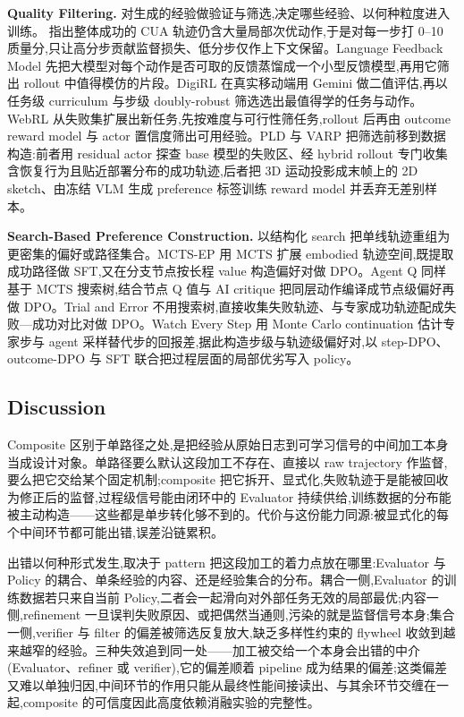 \textbf{Quality Filtering.} 对生成的经验做验证与筛选,决定哪些经验、以何种粒度进入训练。\cite{He25g} 指出整体成功的 CUA 轨迹仍含大量局部次优动作,于是对每一步打 0–10 质量分,只让高分步贡献监督损失、低分步仅作上下文保留。Language Feedback Model \cite{Zho24e} 先把大模型对每个动作是否可取的反馈蒸馏成一个小型反馈模型,再用它筛出 rollout 中值得模仿的片段。DigiRL \cite{Bai24} 在真实移动端用 Gemini 做二值评估,再以任务级 curriculum 与步级 doubly-robust 筛选选出最值得学的任务与动作。WebRL \cite{Qi24} 从失败集扩展出新任务,先按难度与可行性筛任务,rollout 后再由 outcome reward model 与 actor 置信度筛出可用经验。PLD \cite{Xia25h} 与 VARP \cite{Sin25b} 把筛选前移到数据构造:前者用 residual actor 探查 base 模型的失败区、经 hybrid rollout 专门收集含恢复行为且贴近部署分布的成功轨迹,后者把 3D 运动投影成末帧上的 2D sketch、由冻结 VLM 生成 preference 标签训练 reward model 并丢弃无差别样本。

\textbf{Search-Based Preference Construction.} 以结构化 search 把单线轨迹重组为更密集的偏好或路径集合。MCTS-EP \cite{Xu25q} 用 MCTS 扩展 embodied 轨迹空间,既提取成功路径做 SFT,又在分支节点按长程 value 构造偏好对做 DPO。Agent Q \cite{Put24} 同样基于 MCTS 搜索树,结合节点 Q 值与 AI critique 把同层动作编译成节点级偏好再做 DPO。Trial and Error \cite{Son24} 不用搜索树,直接收集失败轨迹、与专家成功轨迹配成失败—成功对比对做 DPO。Watch Every Step \cite{Xio24} 用 Monte Carlo continuation 估计专家步与 agent 采样替代步的回报差,据此构造步级与轨迹级偏好对,以 step-DPO、outcome-DPO 与 SFT 联合把过程层面的局部优劣写入 policy。

\subsection{Discussion}

Composite 区别于单路径之处,是把经验从原始日志到可学习信号的中间加工本身当成设计对象。单路径要么默认这段加工不存在、直接以 raw trajectory 作监督,要么把它交给某个固定机制;composite 把它拆开、显式化,失败轨迹于是能被回收为修正后的监督,过程级信号能由闭环中的 Evaluator 持续供给,训练数据的分布能被主动构造——这些都是单步转化够不到的。代价与这份能力同源:被显式化的每个中间环节都可能出错,误差沿链累积。

出错以何种形式发生,取决于 pattern 把这段加工的着力点放在哪里:Evaluator 与 Policy 的耦合、单条经验的内容、还是经验集合的分布。耦合一侧,Evaluator 的训练数据若只来自当前 Policy,二者会一起滑向对外部任务无效的局部最优;内容一侧,refinement 一旦误判失败原因、或把偶然当通则,污染的就是监督信号本身;集合一侧,verifier 与 filter 的偏差被筛选反复放大,缺乏多样性约束的 flywheel 收敛到越来越窄的经验。三种失效追到同一处——加工被交给一个本身会出错的中介(Evaluator、refiner 或 verifier),它的偏差顺着 pipeline 成为结果的偏差;这类偏差又难以单独归因,中间环节的作用只能从最终性能间接读出、与其余环节交缠在一起,composite 的可信度因此高度依赖消融实验的完整性。

